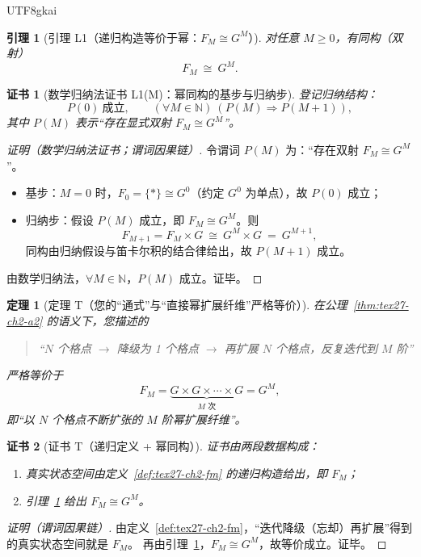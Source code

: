 \documentclass[12pt]{article}
\newtheorem{theorem}{定理}[section]
\newtheorem{lemma}{引理}[section]
\newtheorem{Certificate}{证书}[section]
\newcommand{\NN}{\mathbb{N}}
\begin{document}
\begin{CJK*}{UTF8}{gkai}
\begin{lemma}[引理 L1（递归构造等价于幂：$F_M\cong G^{M}$）]
\label{lem:tex27-ch2-l1}
对任意 $M\ge 0$，有同构（双射）
\[
  F_M\ \cong\ G^{M}.
\]
\end{lemma}

\begin{Certificate}[数学归纳法证书 L1(M)：幂同构的基步与归纳步]
\label{cert:tex27-ch2-l1}
登记归纳结构：
\[
  P(0)\ \text{成立},\qquad (\forall M\in\NN)\ (P(M)\Rightarrow P(M+1)),
\]
其中 $P(M)$ 表示“存在显式双射 $F_M\cong G^{M}$”。
\end{Certificate}

\begin{proof}[证明（数学归纳法证书；谓词因果链）]
令谓词 $P(M)$ 为：“存在双射 $F_M\cong G^{M}$”。
\begin{itemize}
  \item 基步：$M=0$ 时，$F_0=\{\ast\}\cong G^0$（约定 $G^0$ 为单点），故 $P(0)$ 成立；
  \item 归纳步：假设 $P(M)$ 成立，即 $F_M\cong G^{M}$。则
  \[
    F_{M+1}=F_M\times G\ \cong\ G^{M}\times G\ =\ G^{M+1},
  \]
  同构由归纳假设与笛卡尔积的结合律给出，故 $P(M+1)$ 成立。
\end{itemize}
由数学归纳法，$\forall M\in\NN$，$P(M)$ 成立。证毕。
\end{proof}

\begin{theorem}[定理 T（您的“通式”与“直接幂扩展纤维”严格等价）]
\label{thm:tex27-ch2-t}
在公理~\ref{thm:tex27-ch2-a2} 的语义下，您描述的
\begin{quote}
``$N$ 个格点 $\to$ 降级为 1 个格点 $\to$ 再扩展 $N$ 个格点，反复迭代到 $M$ 阶''
\end{quote}
严格等价于
\[
  F_M=\underbrace{G\times G\times\cdots\times G}_{M\text{ 次}}=G^{M},
\]
即“以 $N$ 个格点不断扩张的 $M$ 阶幂扩展纤维”。
\end{theorem}

\begin{Certificate}[证书 T（递归定义 + 幂同构）]
\label{cert:tex27-ch2-t}
证书由两段数据构成：
\begin{enumerate}
  \item 真实状态空间由定义~\ref{def:tex27-ch2-fm} 的递归构造给出，即 $F_M$；
  \item 引理~\ref{lem:tex27-ch2-l1} 给出 $F_M\cong G^M$。
\end{enumerate}
\end{Certificate}

\begin{proof}[证明（谓词因果链）]
由定义~\ref{def:tex27-ch2-fm}，“迭代降级（忘却）再扩展”得到的真实状态空间就是 $F_M$。
再由引理~\ref{lem:tex27-ch2-l1}，$F_M\cong G^{M}$，故等价成立。证毕。
\end{proof}


\end{CJK*}
\end{document}
